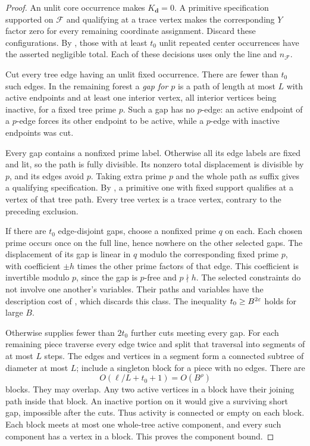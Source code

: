 \begin{proof}
An unlit core occurrence makes $K_{\boldsymbol d}=0$.  A primitive
specification supported on $\mathcal F$ and qualifying at a trace
vertex makes the corresponding $Y$ factor zero for every remaining
coordinate assignment.  Discard these configurations.  By
, those with at least $t_0$ unlit repeated
center occurrences have the asserted negligible total.  Each of
these decisions uses only the line and $n_{\mathcal F}$.

Cut every tree edge having an unlit fixed occurrence.  There are
fewer than $t_0$ such edges.  In the remaining forest a \emph{gap
for $p$} is a path of length at most $L$ with active endpoints and
at least one interior vertex, all interior vertices being inactive,
for a fixed tree prime $p$.  Such a gap has no $p$-edge: an active
endpoint of a $p$-edge forces its
other endpoint to be active, while a $p$-edge with inactive
endpoints was cut.

Every gap contains a nonfixed prime label.  Otherwise all its
edge labels are fixed and lit, so the path is fully divisible.
Its nonzero total displacement is divisible by $p$, and its edges
avoid $p$.  Taking extra prime $p$ and the whole path as suffix
gives a qualifying specification.  By
, a primitive one with fixed support
qualifies at a vertex of that tree path.  Every tree vertex is a
trace vertex, contrary to the preceding exclusion.

If there are $t_0$ edge-disjoint gaps, choose a nonfixed prime $q$
on each.  Each chosen prime occurs once on the full line, hence
nowhere on the other selected gaps.  The displacement of its gap
is linear in $q$ modulo the corresponding fixed prime $p$, with
coefficient $\pm h$ times the other prime factors of that edge.
This coefficient is invertible modulo $p$, since the gap is
$p$-free and $p\nmid h$.  The selected constraints do not involve
one another's variables.  Their paths and variables have the
description cost of , which discards
this class.  The inequality $t_0\ge B^{2\varepsilon}$ holds for large $B$.

Otherwise  supplies fewer than
$2t_0$ further cuts meeting every gap.  For each remaining piece
traverse every edge twice and split that traversal into segments
of at most $L$ steps.  The edges and vertices in a segment form
a connected subtree of diameter at most $L$; include a singleton
block for a piece with no edges.  There are
\[
 O(\ell/L+t_0+1)=O(B^\rho)
\]
blocks.  They may overlap.  Any two active vertices in a block
have their joining path inside that block.  An inactive portion
on it would give a surviving short gap, impossible after the cuts.
Thus activity is connected or empty on each block.  Each block
meets at most one whole-tree active component, and every such
component has a vertex in a block.  This proves the component bound.
\end{proof}

